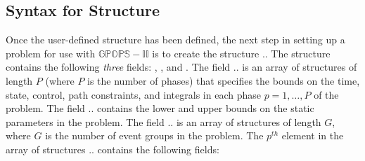 \documentclass[10pt]{article}
\newcommand{\bfblue}[1]{\textrm{{\color{blue}{\bf #1}}}}
\newcommand{\slred}[1]{\textrm{\color{red}{\sl #1}}}
\begin{document}
\subsection{Syntax for \bfblue{bounds} Structure \label{sect:bounds}}

Once the user-defined structure \slred{input} has been defined, the 
next step in setting up a problem for use with $\mathbb{GPOPS-II}$ is to
create the structure \slred{input}.\bfblue{bounds}. The structure
\bfblue{bounds} contains the following {\em three} fields:
\bfblue{phase}, \bfblue{parameters}, and \bfblue{eventgroup}.  The 
field \slred{input}.\bfblue{bounds}.\bfblue{phase} is an array of structures
of length $P$ (where $P$ is the number of phases) that specifies the
bounds on the time, state, control, path constraints, and integrals in
each phase $p=1,\ldots,P$ of the problem.  The field
\slred{input}.\bfblue{bounds}.\bfblue{parameters} contains the lower
and upper bounds on the static parameters in the problem.  The field 
\slred{input}.\bfblue{bounds}.\bfblue{eventgroup} is an array of
structures of length $G$, where $G$ is the number of event groups in
the problem.  The $p^{th}$ element in the array of structures
\slred{input}.\bfblue{bounds}.\bfblue{phase} contains the following fields:
\end{document}
